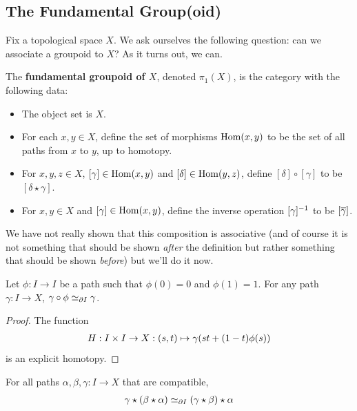 \subsection{The Fundamental Group(oid)}

Fix a topological space $X$. We ask ourselves the following question: can we associate a groupoid to $X$? As it turns out, we can.

\begin{boxdefinition}
    The \textbf{fundamental groupoid of $X$}, denoted $\pi_1(X)$, is the category with the following data:
    \begin{itemize}
        \item The object set is $X$.
        \item For each $x, y \in X$, define the set of morphisms $\operatorname{Hom}(x, y)$ to be the set of all paths from $x$ to $y$, up to homotopy.
        \item For $x, y, z \in X$, $[\gamma] \in \operatorname{Hom}(x, y)$ and $[\delta] \in \operatorname{Hom}(y, z)$, define $[\delta] \circ [\gamma]$ to be $[\delta \star \gamma]$.
        \item For $x, y \in X$ and $[\gamma] \in \operatorname{Hom}(x, y)$, define the inverse operation $[\gamma]^{-1}$ to be $\left[ \overline{\gamma} \right]$.
    \end{itemize}
\end{boxdefinition}

We have not really shown that this composition is associative (and of course it is not something that should be shown \textit{after} the definition but rather something that should be shown \textit{before}) but we'll do it now.

\begin{boxlemma}
    Let $\phi : I \to I$ be a path such that $\phi(0) = 0$ and $\phi(1) = 1$. For any path $\gamma : I \to X$, $\gamma \circ \phi \simeq_{\partial I} \gamma$.
\end{boxlemma}
\begin{proof}
    The function
    \begin{align*}
        H : I \times I \to X : (s, t) \mapsto \gamma\!\left( st + (1-t)\phi(s) \right)
    \end{align*}
    is an explicit homotopy.
\end{proof}

\begin{boxcorollary}\label{Ch1:Cor:path_comp_assoc}
    For all paths $\alpha, \beta, \gamma : I \to X$ that are compatible,
    \begin{align*}
        \gamma \star \left( \beta \star \alpha \right) \simeq_{\partial I} \left( \gamma \star \beta \right) \star \alpha
    \end{align*}
\end{boxcorollary}

